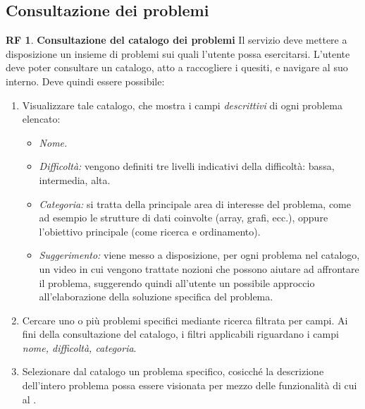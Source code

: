\documentclass[11pt, a4paper]{article}
\theoremstyle{definition}
\newtheorem{funcreq}{RF} %
\begin{document}
\subsection{Consultazione dei problemi}

\begin{funcreq}
\label{probcatalogue}
\textbf{Consultazione del catalogo dei problemi }
Il servizio deve mettere a disposizione un insieme di problemi sui quali
l'utente possa esercitarsi. L'utente deve poter consultare un catalogo,
atto a raccogliere i quesiti, e navigare al suo interno. Deve quindi
essere possibile:
\begin{enumerate}
    \item Visualizzare tale catalogo, che mostra i campi \textit{descrittivi}
    di ogni problema elencato:
    \begin{itemize}
        \item \textit{Nome.}
        
        \item \textit{Difficoltà:} vengono definiti tre livelli indicativi
        della difficoltà: bassa, intermedia, alta.
        
        \item \textit{Categoria:} si tratta della principale area di interesse
        del problema, come ad esempio le strutture di dati coinvolte
        (array, grafi, ecc.), oppure l'obiettivo principale (come ricerca
        e ordinamento).

        \item \textit{Suggerimento:} viene messo a disposizione, per ogni
        problema nel catalogo, un video in cui vengono trattate nozioni che
        possono aiutare ad affrontare il problema, suggerendo quindi all'utente un
        possibile approccio all'elaborazione della soluzione specifica del
        problema.
    \end{itemize}
    
    \item Cercare uno o più problemi specifici mediante ricerca filtrata per campi.
    Ai fini della consultazione del catalogo, i filtri applicabili riguardano i
    campi \textit{nome, difficoltà, categoria}.

    \item Selezionare dal catalogo un problema specifico, cosicché la
    descrizione dell'intero problema possa essere visionata per mezzo
    delle funzionalità di cui al \textcolor{blue}{}.
\end{enumerate}
\end{funcreq}
\end{document}
